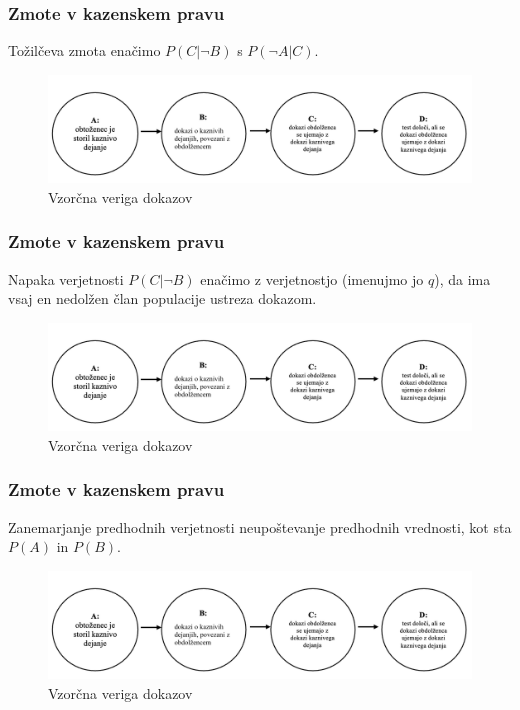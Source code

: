 \documentclass{beamer}
\begin{document}
\begin{frame}
    \frametitle{Zmote v kazenskem pravu}
    \begin{block}{Tožilčeva zmota}
        enačimo $P(C \lvert \neg B)$ s $P(\neg A \lvert C)$.
    \end{block}
    \begin{figure}[!ht]\label{fig:slika_3}
        \centering
        \includegraphics[scale=0.50]{slika_3.png}
        \caption{Vzorčna veriga dokazov}
    \end{figure}
\end{frame}

\begin{frame}
    \frametitle{Zmote v kazenskem pravu}
    \begin{block}{Napaka verjetnosti}
        $P(C \lvert \neg B)$ enačimo z verjetnostjo (imenujmo jo $q$), da ima vsaj en nedolžen član populacije ustreza dokazom.
    \end{block}
    \begin{figure}[!ht]\label{fig:slika_3}
        \centering
        \includegraphics[scale=0.50]{slika_3.png}
        \caption{Vzorčna veriga dokazov}
    \end{figure}
\end{frame}

\begin{frame}
    \frametitle{Zmote v kazenskem pravu}
    \begin{block}{Zanemarjanje predhodnih verjetnosti}
        neupoštevanje predhodnih vrednosti, kot sta $P(A)$ in $P(B)$.
    \end{block}
    \begin{figure}[!ht]\label{fig:slika_3}
        \centering
        \includegraphics[scale=0.50]{slika_3.png}
        \caption{Vzorčna veriga dokazov}
    \end{figure}
\end{frame}
\end{document}
